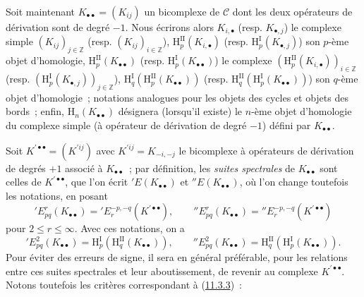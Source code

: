 \begin{env}[11.3.5]
\label{0.11.3.5-fr}
Soit maintenant $K_{\bullet\bullet}=(K_{ij})$ un bicomplexe de
$\mathcal C$ dont les deux opérateurs de dérivation sont de degré $-1$. Nous
écrirons alors $K_{i,\bullet}$ (resp. $K_{\bullet,j}$) le complexe simple
$(K_{ij})_{j\in\mathbb Z}$ (resp. $(K_{ij})_{i\in\mathbb Z}$),
$\mathrm H_p^{\mathrm{II}}(K_{i,\bullet})$ (resp.
$\mathrm H_p^{\mathrm I}(K_{\bullet,j})$) son $p$-ème objet d'homologie,
$\mathrm H_p^{\mathrm{II}}(K_{\bullet\bullet})$ (resp.
$\mathrm H_p^{\mathrm I}(K_{\bullet\bullet})$) le complexe
$(\mathrm H_p^{\mathrm{II}}(K_{i,\bullet}))_{i\in\mathbb Z}$ (resp.
$(\mathrm H_p^{\mathrm I}(K_{\bullet,j}))_{j\in\mathbb Z}$),
$\mathrm H_q^{\mathrm I}(\mathrm H_p^{\mathrm{II}}(K_{\bullet\bullet}))$
(resp.
$\mathrm H_q^{\mathrm{II}}(\mathrm H_p^{\mathrm I}(K_{\bullet\bullet}))$)
son $q$-ème objet d'homologie~; notations analogues pour les objets des cycles
et objets des bords~; enfin, $\mathrm H_n(K_{\bullet\bullet})$ désignera
(lorsqu'il existe) le $n$-ème objet d'homologie du complexe simple (à
opérateur de dérivation de degré $-1$) défini par $K_{\bullet\bullet}$.

Soit $K^{\prime\bullet\bullet}=(K^{\prime ij})$ avec
$K^{\prime ij}=K_{-i,-j}$ le bicomplexe à opérateurs de dérivation de degrés
$+1$ associé à $K_{\bullet\bullet}$~; par définition, les
\emph{suites spectrales} de $K_{\bullet\bullet}$ sont celles de
$K^{\prime\bullet\bullet}$, que l'on écrit $'E(K_{\bullet\bullet})$ et
$''E(K_{\bullet\bullet})$, où l'on change toutefois les notations, en posant
\[
  'E_{pq}^r(K_{\bullet\bullet})
  ='E_r^{-p,-q}(K^{\prime\bullet\bullet}),\qquad
  ''E_{pq}^r(K_{\bullet\bullet})
  =''E_r^{-p,-q}(K^{\prime\bullet\bullet})
\]
pour $2\leq r\leq\infty$. Avec ces notations, on a
\[
  'E_{pq}^2(K_{\bullet\bullet})
  =\mathrm H_p^{\mathrm I}(\mathrm H_q^{\mathrm{II}}(K_{\bullet\bullet})),
  \qquad
  ''E_{pq}^2(K_{\bullet\bullet})
  =\mathrm H_q^{\mathrm{II}}(\mathrm H_p^{\mathrm I}(K_{\bullet\bullet})).
\]
Pour éviter des erreurs de signe, il sera en général préférable, pour les
relations entre ces suites spectrales et leur aboutissement, de revenir au
complexe $K^{\prime\bullet\bullet}$. Notons toutefois les critères
correspondant à (\hyperref[0.11.3.3-fr]{11.3.3})~:
\end{env}

